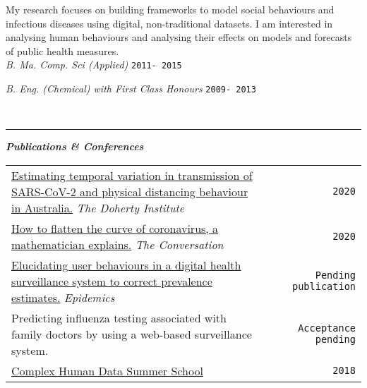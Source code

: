 \documentclass{article}
\newcommand{\HRule}{\rule{\linewidth}{0.5mm}}
\begin{document}
My research focuses on building frameworks to model social behaviours and infectious diseases using digital, non-traditional datasets. I am interested in analysing human behaviours and analysing their effects on models and forecasts of public health measures. \\

\emph{B. Ma. Comp. Sci (Applied)} \hfill  \texttt{2011- 2015}


\emph{B. Eng. (Chemical) with First Class Honours} \hfill \texttt{2009- 2013}

\\
\HRule

\textbf{\emph{Publications \& Conferences}}
\begin{table}[h!] \small
\begin{tabular}{ p{12.1cm} c r}

\href{https://www.doherty.edu.au/uploads/content_doc/Technical_report_4_update_29July2020.pdf"}{
        Estimating temporal variation in transmission of SARS-CoV-2 and physical distancing behaviour in Australia.} \emph{The Doherty Institute} && \texttt{2020}\\

\href{https://theconversation.com/how-to-flatten-the-curve-of-coronavirus-a-mathematician-explains-133514}{How to flatten the curve of coronavirus, a mathematician explains.} \emph{The Conversation} & & \texttt{2020} \\
	
 \href{https://www.medrxiv.org/content/10.1101/19003715v2}{Elucidating user behaviours in a digital health surveillance system to correct prevalence estimates.} \emph{Epidemics} & & \texttt{Pending publication} \\

 Predicting influenza testing associated with family doctors by using a web-based surveillance system. & & \texttt{Acceptance pending} \\

 \href{https://chdsummerschool.com/}{Complex Human Data Summer School} & & \texttt{2018} \\

\end{tabular}
\end{table}
\end{document}
